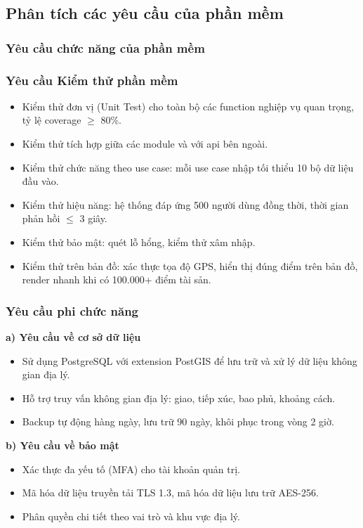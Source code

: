 \subsection{Phân tích các yêu cầu của phần mềm}

\subsubsection{Yêu cầu chức năng của phần mềm}
  
 \subsubsection{Yêu cầu Kiểm thử phần mềm}
\begin{itemize}
    \item Kiểm thử đơn vị (Unit Test) cho toàn bộ các function nghiệp vụ quan trọng, tỷ lệ coverage $\ge$ 80\%.
    \item Kiểm thử tích hợp giữa các module và với \gls{api} bên ngoài.
    \item Kiểm thử chức năng theo use case: mỗi use case nhập tối thiểu 10 bộ dữ liệu đầu vào.
    \item Kiểm thử hiệu năng: hệ thống đáp ứng 500 người dùng đồng thời, thời gian phản hồi $\le$ 3 giây.
    \item Kiểm thử bảo mật: quét lỗ hổng, kiểm thử xâm nhập.
    \item Kiểm thử trên bản đồ: xác thực tọa độ GPS, hiển thị đúng điểm trên bản đồ, render nhanh khi có 100.000+ điểm tài sản.
\end{itemize}

\subsubsection{Yêu cầu phi chức năng}

\textbf{a) Yêu cầu về cơ sở dữ liệu}
\begin{itemize}
    \item Sử dụng PostgreSQL với extension PostGIS để lưu trữ và xử lý dữ liệu không gian địa lý.
    \item Hỗ trợ truy vấn không gian địa lý: giao, tiếp xúc, bao phủ, khoảng cách.
    \item Backup tự động hàng ngày, lưu trữ 90 ngày, khôi phục trong vòng 2 giờ.
\end{itemize}

\textbf{b) Yêu cầu về bảo mật}
\begin{itemize}
    \item Xác thực đa yếu tố (MFA) cho tài khoản quản trị.
    \item Mã hóa dữ liệu truyền tải TLS 1.3, mã hóa dữ liệu lưu trữ AES-256.
    \item Phân quyền chi tiết theo vai trò và khu vực địa lý.
\end{itemize}

